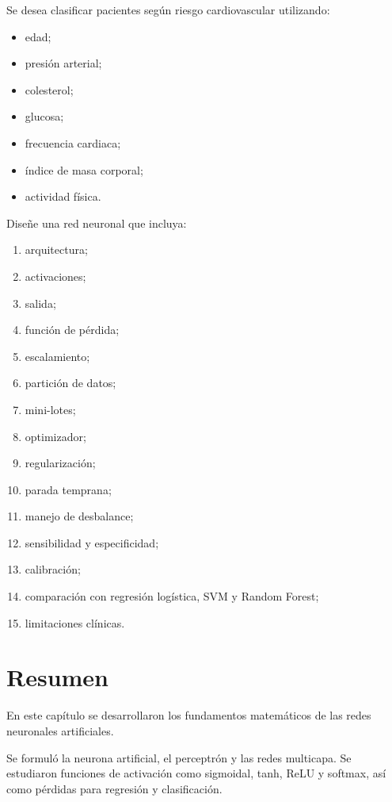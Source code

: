 \documentclass[
  spanish,
  10.5pt,
  letterpaper,
  DIV=11,
  numbers=noendperiod,
  oneside,
  open=any]{scrreprt}
\providecommand{\tightlist}{%
  \setlength{\itemsep}{0pt}\setlength{\parskip}{0pt}}
\theoremstyle{definition}
\theoremstyle{definition}
\theoremstyle{plain}
\theoremstyle{remark}
\begin{document}

Se desea clasificar pacientes según riesgo cardiovascular utilizando:

\begin{itemize}
\tightlist
\item
  edad;
\item
  presión arterial;
\item
  colesterol;
\item
  glucosa;
\item
  frecuencia cardiaca;
\item
  índice de masa corporal;
\item
  actividad física.
\end{itemize}

Diseñe una red neuronal que incluya:

\begin{enumerate}
\def\labelenumi{\arabic{enumi}.}
\tightlist
\item
  arquitectura;
\item
  activaciones;
\item
  salida;
\item
  función de pérdida;
\item
  escalamiento;
\item
  partición de datos;
\item
  mini-lotes;
\item
  optimizador;
\item
  regularización;
\item
  parada temprana;
\item
  manejo de desbalance;
\item
  sensibilidad y especificidad;
\item
  calibración;
\item
  comparación con regresión logística, SVM y Random Forest;
\item
  limitaciones clínicas.
\end{enumerate}

\section*{Resumen}\label{resumen-14}


En este capítulo se desarrollaron los fundamentos matemáticos de las
redes neuronales artificiales.

Se formuló la neurona artificial, el perceptrón y las redes multicapa.
Se estudiaron funciones de activación como sigmoidal, tanh, ReLU y
softmax, así como pérdidas para regresión y clasificación.
\end{document}
